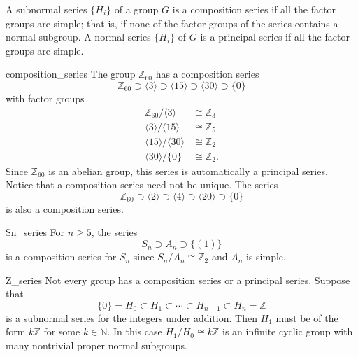 A subnormal series $\{ H_i \}$ of a group $G$ is a {\bfi composition
series\/} if all the factor groups are 
simple; that is, if none of the factor groups of the series contains a
normal subgroup. A normal series $\{ H_i \}$ of $G$ is a {\bfi 
principal series\/} if all the factor groups 
are simple.  
 
 
 
\begin{example}{composition_series}
The group ${\mathbb Z}_{60}$ has  a composition series 
\[
{\mathbb Z}_{60} \supset \langle 3 \rangle \supset  \langle 15 \rangle
\supset \langle 30 \rangle  \supset \{ 0 \}
\]
with factor groups
\begin{align*}
{\mathbb Z}_{60} / \langle 3 \rangle & \cong  {\mathbb Z}_{3} \\
\langle 3 \rangle / \langle 15 \rangle & \cong  {\mathbb Z}_{5} \\
\langle 15 \rangle / \langle 30 \rangle & \cong  {\mathbb Z}_{2} \\
\langle 30 \rangle / \{ 0 \} & \cong  {\mathbb Z}_2.
\end{align*}
Since ${\mathbb Z}_{60}$ is an abelian group, this series is
automatically a principal series. Notice that a composition series
need not be unique.  The series 
\[
{\mathbb Z}_{60} \supset \langle 2 \rangle \supset \langle 4 \rangle 
\supset  \langle 20 \rangle \supset \{ 0 \}
\]
is also a composition series.
\end{example}
 
 
 
\begin{example}{Sn_series}
For $n \geq 5$, the series
\[
S_n \supset A_n \supset \{ (1) \}
\]
is a composition series for $S_n$ since $S_n / A_n \cong {\mathbb Z}_2$
and $A_n$ is simple.
\end{example}
 
 
 
\begin{example}{Z_series}
Not every group has a composition series or a principal series.
Suppose that 
\[
\{ 0 \} = H_0 \subset H_1 \subset \cdots \subset H_{n-1}
\subset H_n = {\mathbb Z}
\]
is a subnormal series for the integers under addition. Then $H_1$ must
be of the form $k {\mathbb Z}$ for some $k \in {\mathbb N}$. In this case
$H_1 / H_0 \cong k {\mathbb Z}$ is an infinite cyclic group with many
nontrivial proper normal subgroups. 
\end{example}

